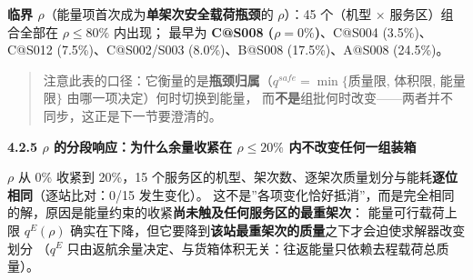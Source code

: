 \documentclass[
  10.5pt,
]{article}
\begin{document}
\textbf{临界 \(\rho\)}（能量项首次成为\textbf{单架次安全载荷瓶颈}的
\(\rho\)）：45 个（机型 × 服务区）组合全部在 \(\rho\le80\%\) 内出现；
最早为 \textbf{C@S008 (\(\rho=0\%\))}、C@S004 (3.5\%)、C@S012
(7.5\%)、C@S002/S003 (8.0\%)、B@S008 (17.5\%)、A@S008 (24.5\%)。

\begin{quote}
注意此表的口径：它衡量的是\textbf{瓶颈归属}（\(q^{safe}=\min\{\)质量限,
体积限, 能量限\(\}\) 由哪一项决定）何时切换到能量，
而\textbf{不是}组批何时改变------两者并不同步，这正是下一节要澄清的。
\end{quote}

\textbf{4.2.5 \(\rho\) 的分段响应：为什么余量收紧在 \(\rho\le20\%\)
内不改变任何一组装箱}

\(\rho\) 从 0\% 收紧到 20\%，15
个服务区的机型、架次数、逐架次质量划分与能耗\textbf{逐位相同}（逐站比对：0/15
发生变化）。
这不是''各项变化恰好抵消''，而是完全相同的解，原因是能量约束的收紧\textbf{尚未触及任何服务区的最重架次}：
能量可行载荷上限 \(q^E(\rho)\)
确实在下降，但它要降到\textbf{该站最重架次的质量}之下才会迫使求解器改变划分
（\(q^E\)
只由返航余量决定、与货箱体积无关：往返能量只依赖去程载荷总质量）。
\end{document}
